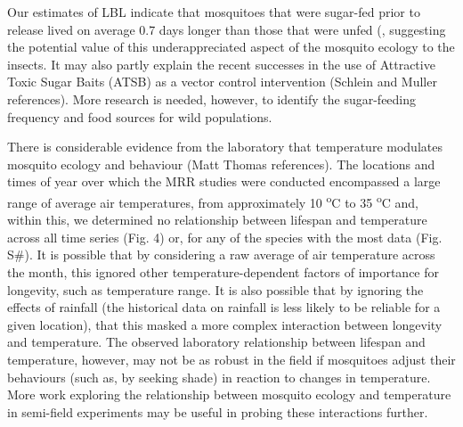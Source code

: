 \documentclass[]{article}
\begin{document}
Our estimates of LBL indicate that mosquitoes that were sugar-fed prior
to release lived on average 0.7 days longer than those that were unfed
(, suggesting the potential value of this underappreciated aspect of the
mosquito ecology to the insects. It may also partly explain the recent
successes in the use of Attractive Toxic Sugar Baits (ATSB) as a vector
control intervention (Schlein and Muller references). More research is
needed, however, to identify the sugar-feeding frequency and food
sources for wild populations.

There is considerable evidence from the laboratory that temperature
modulates mosquito ecology and behaviour (Matt Thomas references). The
locations and times of year over which the MRR studies were conducted
encompassed a large range of average air temperatures, from
approximately 10 \textsuperscript{o}C to 35 \textsuperscript{o}C and,
within this, we determined no relationship between lifespan and
temperature across all time series (Fig. 4) or, for any of the species
with the most data (Fig. S\#). It is possible that by considering a raw
average of air temperature across the month, this ignored other
temperature-dependent factors of importance for longevity, such as
temperature range. It is also possible that by ignoring the effects of
rainfall (the historical data on rainfall is less likely to be reliable
for a given location), that this masked a more complex interaction
between longevity and temperature. The observed laboratory relationship
between lifespan and temperature, however, may not be as robust in the
field if mosquitoes adjust their behaviours (such as, by seeking shade)
in reaction to changes in temperature. More work exploring the
relationship between mosquito ecology and temperature in semi-field
experiments may be useful in probing these interactions further.
\end{document}
